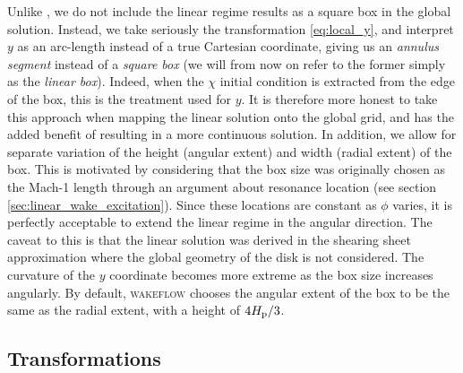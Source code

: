 Unlike \citet{bollati2021}, we do not include the linear regime results as a square box in the global solution.
Instead, we take seriously the transformation \ref{eq:local_y}, and interpret $y$ as an arc-length instead of a true Cartesian coordinate, giving us an \textit{annulus segment} instead of a \textit{square box} (we will from now on refer to the former simply as the \textit{linear box}).
Indeed, when the $\chi$ initial condition is extracted from the edge of the box, this is the treatment used for $y$.
It is therefore more honest to take this approach when mapping the linear solution onto the global grid, and has the added benefit of resulting in a more continuous solution.
In addition, we allow for separate variation of the height (angular extent) and width (radial extent) of the box.
This is motivated by considering that the box size was originally chosen as the Mach-1 length through an argument about resonance location (see section \ref{sec:linear_wake_excitation}).
Since these locations are constant as $\phi$ varies, it is perfectly acceptable to extend the linear regime in the angular direction.
The caveat to this is that the linear solution was derived in the shearing sheet approximation where the global geometry of the disk is not considered.
The curvature of the $y$ coordinate becomes more extreme as the box size increases angularly.
By default, \textsc{wakeflow} chooses the angular extent of the box to be the same as the radial extent, with a height of $4H_{\rm p}/3$.

\subsection{Transformations} \label{sec:transformations}


